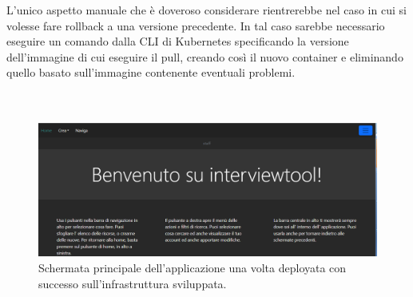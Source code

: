 \documentclass[a4paper,12pt]{report}
\begin{document}
L'unico aspetto manuale che è doveroso considerare rientrerebbe nel caso in cui si volesse fare rollback a una versione precedente. In tal caso sarebbe necessario eseguire un comando dalla CLI di Kubernetes specificando la versione dell'immagine di cui eseguire il pull, creando così il nuovo container e eliminando quello basato sull'immagine contenente eventuali problemi. \\ \\ \\ 
\begin{figure}[h]
	\includegraphics[width=1.0\textwidth]{app_micro}
    \caption{Schermata principale dell'applicazione una volta deployata con successo sull'infrastruttura sviluppata.}
    \label{fig:app_micro}
\end{figure} \leavevmode \\ \\ \\ \\ \\ \\ \\ \\ \\ \\ \\ \\ \\ \\ \\ \\ \\ \\
\end{document}

